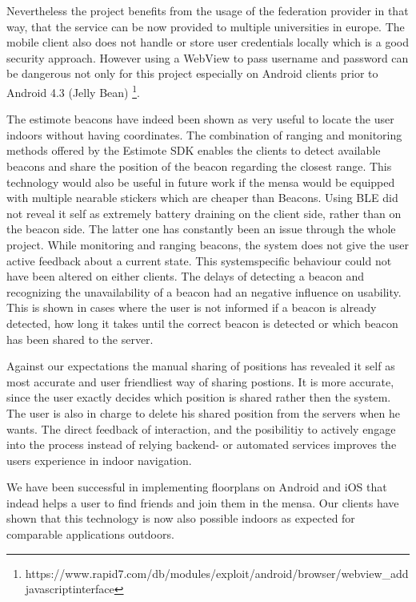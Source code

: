 Nevertheless the project benefits from the usage of the federation provider in that way, that the service can be now provided to multiple universities in europe. The mobile client also does not handle or store user credentials locally which is a good security approach. 
However using a WebView to pass username and password can be dangerous not only for this project especially on Android clients prior to Android 4.3 (Jelly Bean) \footnote{https://www.rapid7.com/db/modules/exploit/android/browser/webview_addjavascriptinterface}.



The estimote beacons have indeed been shown as very useful to locate the user indoors without having coordinates. The combination of ranging and monitoring methods offered by the Estimote SDK enables the clients to detect available beacons and share the position of the beacon regarding the closest range. This technology would also be useful in future work if the mensa would be equipped with multiple nearable stickers which are cheaper than Beacons. Using BLE did not reveal it self as extremely battery draining on the client side, rather than on the beacon side. The latter one has constantly been an issue through the whole project. 
While monitoring and ranging beacons, the system does not give the user active feedback about a current state. This systemspecific behaviour could not have been altered on either clients. The delays of detecting a beacon and recognizing the unavailability of a beacon had an negative influence on usability. This is shown in cases where the user is not informed if a beacon is already
detected, how long it takes until the correct beacon is detected or which beacon has been shared to the server. 



Against our expectations the manual sharing of positions has revealed it self as most accurate and user friendliest way of sharing postions. It is more accurate, since the user exactly decides which position is shared rather then the system. The user is also in charge to delete his shared position from the servers when he wants. The direct feedback of interaction, and the posibilitiy to actively engage into the process instead of relying backend- or automated services improves the users experience in indoor navigation. 

We have been successful in implementing floorplans on Android and iOS that indead helps a user to find friends and join them in the mensa. Our clients have shown that this technology is now also possible indoors as expected for comparable applications outdoors. 

